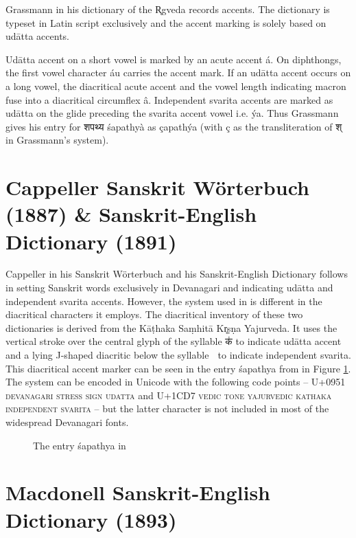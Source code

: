 Grassmann in his dictionary of the R̥gveda \citep{gra} records accents. The dictionary is typeset in Latin script exclusively and the accent marking is solely based on udātta accents.

Udātta accent on a short vowel is marked by an acute accent á. On diphthongs, the first vowel character áu carries the accent mark. If an udātta accent occurs on a long vowel, the diacritical acute accent and the vowel length indicating macron fuse into a diacritical circumflex â. Independent svarita accents are marked as udātta on the glide preceding the svarita accent vowel i.e. ýa. Thus Grassmann gives his entry for {\devfont शपथ्य} śapathyà as çapathýa (with ç as the transliteration of {\devfont श्} in Grassmann’s system). 

\section{Cappeller Sanskrit Wörterbuch (1887) \& Sanskrit-English Dictionary (1891)}

Cappeller in his Sanskrit Wörterbuch \citep{ccs} and his Sanskrit-English Dictionary \citep{cae} follows \citet{pwg} in setting Sanskrit words exclusively in Devanagari and indicating udātta and independent svarita accents. However, the system used in \citet{ccs,cae} is different in the diacritical characters it employs. The diacritical inventory of these two dictionaries is derived from the Kāṭhaka Saṃhitā Kr̥ṣṇa Yajurveda. It uses the vertical stroke over the central glyph of the syllable {\devfont क॑} to indicate udātta accent and a lying J-shaped diacritic below the syllable {\devfont क᳗} to indicate independent svarita. This diacritical accent marker can be seen in the entry śapathya from \citet{cae} in Figure \ref{fig:Capeller-SapaTya}. The system can be encoded in Unicode with the following code points – U+0951 \textsc{devanagari stress sign udatta} and U+1CD7 \textsc{vedic tone yajurvedic kathaka independent svarita} – but the latter character is not included in most of the widespread Devanagari fonts. 

\begin{figure}[!ht]
\begin{center}
\end{center}
\caption[The entry śapathya in \citet{cae}]{\label{fig:Capeller-SapaTya}The entry śapathya in \citet{cae}}
\end{figure}

\section{Macdonell Sanskrit-English Dictionary (1893)}

